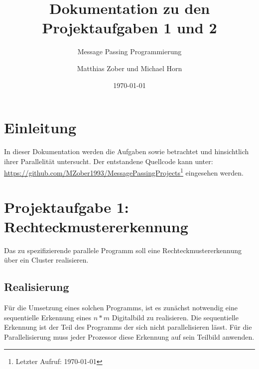 	
					
\title{Dokumentation zu den Projektaufgaben 1 und 2}
\subtitle{Message Passing Programmierung}

\author{Matthias Zober und Michael Horn}
\date{\today}

\maketitle

\tableofcontents
\pagebreak

\section{Einleitung}
In dieser Dokumentation werden die Aufgaben  sowie  betrachtet und hinsichtlich ihrer Parallelität untersucht.
Der entstandene Quellcode kann unter:\\
\url{https://github.com/MZober1993/MessagePassingProjects}\footnote{Letzter Aufruf: \today}
eingesehen werden.
\section{Projektaufgabe 1: Rechteckmustererkennung}
Das zu spezifizierende parallele Programm soll eine Rechteckmustererkennung über ein Cluster realisieren.
\subsection{Realisierung}

Für die Umsetzung eines solchen Programms, ist es zunächst notwendig eine sequentielle Erkennung eines $n*m$ Digitalbild zu realisieren.
Die sequentielle Erkennung ist der Teil des Programms der sich nicht parallelisieren lässt. Für die Parallelisierung muss jeder Prozessor diese Erkennung auf sein Teilbild anwenden.

